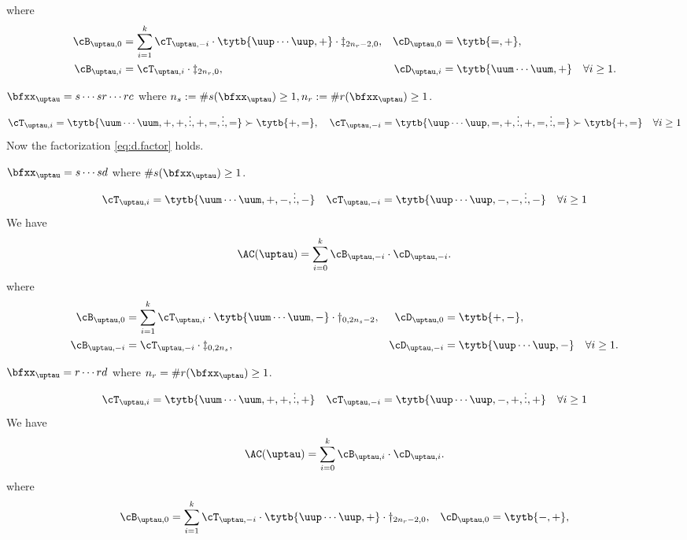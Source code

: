\documentclass[ssunip]{subfiles}
\begin{document}
{\begin{enumT}
\[    \]
    where
      \begin{align*}
        \cB_{\uptau,0} &= \sum_{i=1}^{k}\cT_{\uptau,-i}\cdot \tytb{\uup\cdots\uup,+} \cdot \ddagger_{2n_{r}-2,0}, &
        \cD_{\uptau,0} &= \tytb{=,+},\\
        \cB_{\uptau,i} &= \cT_{\uptau,i}\cdot \ddagger_{2n_{r},0},  &
        \cD_{\uptau,i} &= \tytb{\uum\cdots\uum,+}  \quad \forall i\geq 1.\\
      \end{align*}
    \item $\bfxx_{\uptau} = s\cdots sr\cdots rc$ where
    $n_{s} := \#s(\bfxx_{\uptau})\geq 1, n_{r}:=\#r(\bfxx_{\uptau})\geq 1$.
    \[
      \cT_{\uptau,i} = \tytb{\uum\cdots\uum,+,+,\vdots,+,=,\vdots,=}\succ \tytb{+,=},
      \quad \cT_{\uptau,-i} = \tytb{\uup\cdots\uup,=,+,\vdots,+,=,\vdots,=}\succ \tytb{+,=} \quad \forall i\geq 1
    \]
    Now the factorization \eqref{eq:d.factor} holds.
    \item $\bfxx_{\uptau} = s\cdots sd$ where $\#s(\bfxx_{\uptau})\geq 1$.
    \begin{equation}\label{eq:ped.ssd}
      \cT_{\uptau,i} = \tytb{\uum\cdots\uum,+,-,\vdots,-} \quad \cT_{\uptau,-i} = \tytb{\uup\cdots\uup,-,-,\vdots,-}
      \quad \forall i\geq 1
    \end{equation}
    We have
    \[
      \oAC{\uptau} = \sum_{i=0}^{k}\cB_{\uptau,-i}\cdot \cD_{\uptau,-i}.
    \]
    where
      \begin{align*}
        \cB_{\uptau,0} &= \sum_{i=1}^{k}\cT_{\uptau,i}\cdot \tytb{\uum\cdots\uum,-} \cdot \dagger_{0,2n_{s}-2}, &
        \cD_{\uptau,0} &= \tytb{+,-},\\
        \cB_{\uptau,-i} &= \cT_{\uptau,-i}\cdot \ddagger_{0,2n_{s}},  &
        \cD_{\uptau,-i} &= \tytb{\uup\cdots\uup,-}  \quad \forall i\geq  1.\\
      \end{align*}
    \item $\bfxx_{\uptau} = r\cdots rd$ where $n_{r}=\#r(\bfxx_{\uptau})\geq 1$.
    \[
      \cT_{\uptau,i} = \tytb{\uum\cdots\uum,+,+,\vdots,+} \quad \cT_{\uptau,-i} = \tytb{\uup\cdots\uup,-,+,\vdots,+}
      \quad \forall i\geq 1
    \]
    We have
    \[
      \oAC{\uptau} = \sum_{i=0}^{k}\cB_{\uptau,i}\cdot \cD_{\uptau,i}.
    \]
    where
      \begin{align*}
        \cB_{\uptau,0} &= \sum_{i=1}^{k}\cT_{\uptau,-i}\cdot \tytb{\uup\cdots\uup,+} \cdot \dagger_{2n_{r}-2,0}, &
        \cD_{\uptau,0} &= \tytb{-,+},\\

\end{align*}
\end{enumT}}
\end{document}
